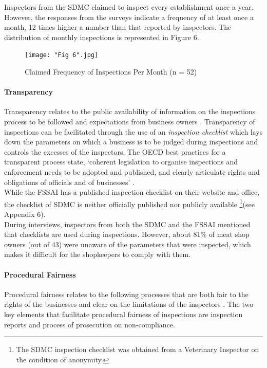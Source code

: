 \documentclass[a4paper, 12pt]{article}
\begin{document}
Inspectors from the SDMC claimed to inspect every establishment once a year. However, the responses from the surveys indicate a frequency of at least once a month, 12 times higher a number than that reported by inspectors. The distribution of monthly inspections is represented in Figure 6. 

\begin{figure}[H]
\centering
\texttt{[image: "Fig 6".jpg]}
\caption[Optional Caption]{Claimed Frequency of Inspections Per Month (n = 52)}
\end{figure} 

\paragraph{Transparency}

Transparency relates to the public availability of information on the inspections process to be followed and expectations from business owners \parencite{blancreport}. Transparency of inspections can be facilitated through the use of an \textit {inspection checklist} which lays down the parameters on which a business is to be judged during inspections and controls the excesses of the inspectors. The OECD best practices for a transparent process state, ‘coherent legislation to organise inspections and enforcement needs to be adopted and published, and clearly articulate rights and obligations of officials and of businesses’ \parencite{oecd1report}.\\

While the FSSAI has a published inspection checklist on their website and office, the checklist of SDMC is neither officially published nor publicly available \footnote{ The SDMC inspection checklist was obtained from a Veterinary Inspector on the condition of anonymity.}(see Appendix 6). \\

During interviews, inspectors from both the SDMC and the FSSAI mentioned that checklists are used during inspections. However, about 81\% of meat shop owners (out of 43) were unaware of the parameters that were inspected, which makes it difficult for the shopkeepers to comply with them. 

\paragraph{Procedural Fairness}

Procedural fairness relates to the following processes that are both fair to the rights of the businesses and clear on the limitations of the inspectors \parencite{oecdreport}. The two key elements that facilitate procedural fairness of inspections are inspection reports and process of prosecution on non-compliance.
\end{document}
